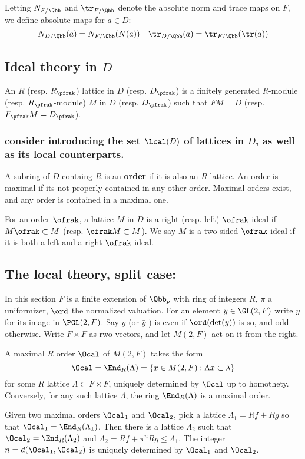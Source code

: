 \documentclass[11pt]{amsart}
\begin{document}
Letting \(N_{F/\Qbb}\) and \(\tr_{F/\Qbb}\) denote the absolute norm and trace maps on \(F\), we define absolute maps for \(a \in D\):
\[ N_{D/\Qbb} (a) = N_{F/\Qbb} (N(a)) \quad \tr_{D/\Qbb} (a) = \tr_{F/\Qbb} (\tr (a)) \]
\subsection{Ideal theory in \(D\)}
\label{sec:orgec6b45e}
An \(R\) (resp.
\(R_\pfrak\)) lattice in \(D\) (resp.
\(D_\pfrak\)) is a finitely generated $R$-module (resp.
$R_\pfrak$-module) \(M\) in \(D\) (resp.
\(D_\pfrak\)) such that \(FM = D\) (resp.
\(F_\pfrak M = D_\pfrak\)).
\subsubsection{consider introducing the set \(\Lcal(D)\) of lattices in \(D\), as well as its local counterparts.}
\label{sec:org7ff204b}
A subring of \(D\) containg \(R\) is an \textbf{order} if it is also an \(R\) lattice.
An order is maximal if its not properly contained in any other order.
Maximal orders exist, and any order is contained in a maximal one.

For an order \(\ofrak\), a lattice \(M\) in \(D\) is a right (resp.
left) $\ofrak$-ideal  if \(M \ofrak \subset M\) (resp.
\(\ofrak M \subset M\)).
We say \(M\) is a two-sided \(\ofrak\) ideal if it is both a left and a right $\ofrak$-ideal.

\subsection{The local theory, split case:}
\label{sec:org7edff72}
In this section \(F\) is a finite extension of \(\Qbb_p\) with ring of integers \(R\),  \(\pi\) a uniformizer, \(\ord\) the normalized valuation.
For an element \(y \in \GL(2,F)\) write \(\bar{y}\) for its image in \(\PGL(2,F)\).
Say \(y\) (or \(\bar{y}\) ) is \uline{even} if \(\ord(\det(y))\) is so, and odd otherwise.
Write \(F \times F\) as rwo vectors, and let \(M(2,F)\) act on it from the right.

A maximal \(R\) order \(\Ocal\) of \(M(2,F)\) takes the form
\[ \Ocal = \End_R(\Lambda) = \{ x \in M(2,F) : \Lambda x \subset \lambda \} \]
for some \(R\) lattice \(\Lambda \subset F \times F\), uniquely determined by \(\Ocal\) up to homothety.
Conversely, for any such lattice \(\Lambda\), the ring \(\End_R(\Lambda)\) is a maximal order.


Given two maximal orders \(\Ocal_1\) and \(\Ocal_2\), pick a lattice \(\Lambda_1 =  Rf +Rg\) so that \(\Ocal_1 = \End_R(\Lambda_1)\).
Then there is a lattice \(\Lambda_2\) such that \(\Ocal_2 = \End_R(\Lambda_2)\) and \(\Lambda_2 = R f + \pi^n R g  \leq \Lambda_1\).
The integer \(n=d(\Ocal_1,\Ocal_2)\) is uniquely determined by \(\Ocal_1\) and \(\Ocal_2\).
\end{document}
